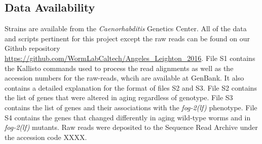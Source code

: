 \documentclass[9pt,twocolumn,twoside]{gsajnl}
\newcommand{\fog}{\emph{\mbox{fog-2(lf)}}}
\begin{document}
\subsection{Data Availability}
\label{sb:data_availability}
Strains are available from the \emph{Caenorhabditis} Genetics Center. All of the
data and scripts pertinent for this project except the raw reads can be found on
our Github repository
\url{https://github.com/WormLabCaltech/Angeles_Leighton_2016}. File S1 contains
the Kallisto commands used to process the read alignments as well as the
accession numbers for the raw-reads, whcih are available at GenBank. It also
contains a detailed explanation for the format of files S2 and S3. File S2
contains the list of genes that were altered in aging regardless of genotype.
File S3 contains the list of genes and their associations with the \fog{}
phenotype. File S4 contains the genes that changed differently in aging
wild-type worms and in \fog{} mutants. Raw reads were deposited to the
Sequence Read Archive under the accession code XXXX.
\end{document}
